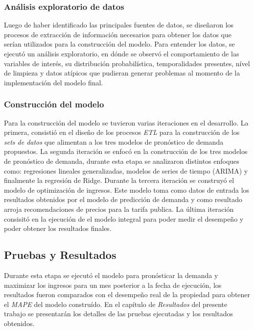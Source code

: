 \subsubsection*{Análisis exploratorio de datos}

Luego de haber identificado las principales fuentes de datos, se diseñaron los procesos de extracción de información necesarios para obtener los datos que serían utilizados para la construcción del modelo. Para entender los datos, se ejecutó un análisis exploratorio, en dónde se observó el comportamiento de las variables de interés, su distribución probabilística, temporalidades presentes, nível de limpieza y datos atípicos que pudieran generar problemas al momento de la implementación del modelo final.

\subsubsection*{Construcción del modelo}

Para la construcción del modelo se tuvieron varias iteraciones en el desarrollo. La primera, consistió en el diseño de los procesos \emph{ETL} para la construcción de los \emph{sets de datos} que alimentan a los tres modelos de pronóstico de demanda propuestos. La segunda iteración se enfocó en la construcción de los tres modelos de pronóstico de demanda, durante esta etapa se analizaron distintos enfoques como: regresiones lineales generalizadas, modelos de series de tiempo (ARIMA) y finalmente la regresión de Ridge. Durante la tercera iteración se construyó el modelo de optimización de ingresos. Este modelo toma como datos de entrada los resultados obtenidos por el modelo de predicción de demanda y como resultado arroja recomendaciones de precios para la tarifa publica. La última iteración consisitó en la ejecución de el modelo integral para poder medir el desempeño y poder obtener los resultados finales.

\subsection*{Pruebas y Resultados}

Durante esta etapa se ejecutó el modelo para pronósticar la demanda y maximizar los ingresos para un mes posterior a la fecha de ejecución, los resultados fueron comparados con el desempeño real de la propiedad para obtener el \emph{MAPE} del modelo construído. En el capítulo de \emph{Resultados} del presente trabajo se presentarán los detalles de las pruebas ejecutadas y los resultados obtenidos.
